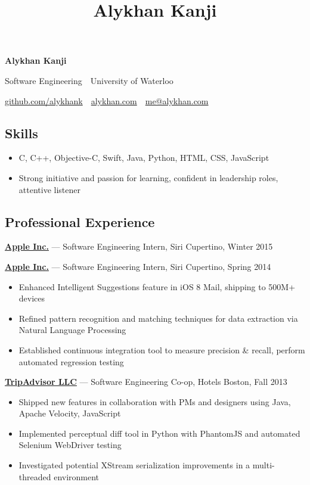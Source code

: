 \documentclass[11pt,letterpaper]{article}
\title{Alykhan Kanji}
\begin{document}
\begin{center}
  {\Huge \textbf{Alykhan Kanji}}

  {\large
    Software Engineering\ \textperiodcentered \ University of Waterloo

    \href{https://github.com/alykhank}{github.com/alykhank}\ \textperiodcentered \ \href{http://alykhan.com}{alykhan.com}\ \textperiodcentered \ \href{mailto:me@alykhan.com}{me@alykhan.com}
  }
\end{center}

\subsection*{Skills}

\begin{itemize}[before=,after=]
  \item C, C++, Objective-C, Swift, Java, Python, HTML, CSS, JavaScript
  \item Strong initiative and passion for learning, confident in leadership roles, attentive listener
\end{itemize}

\subsection*{Professional Experience}

\href{http://apple.com}{\textbf{Apple Inc.}} --- Software Engineering Intern, Siri \hfill {\color{gray} Cupertino, Winter 2015}
\vspace{6mm}

\href{http://apple.com}{\textbf{Apple Inc.}} --- Software Engineering Intern, Siri \hfill {\color{gray} Cupertino, Spring 2014}
\begin{itemize}
  \item Enhanced Intelligent Suggestions feature in iOS 8 Mail, shipping to 500M+ devices
  \item Refined pattern recognition and matching techniques for data extraction via Natural Language Processing
  \item Established continuous integration tool to measure precision \& recall, perform automated regression testing
\end{itemize}

\href{http://tripadvisor.com}{\textbf{TripAdvisor LLC}} --- Software Engineering Co-op, Hotels \hfill {\color{gray} Boston, Fall 2013}
\begin{itemize}
  \item Shipped new features in collaboration with PMs and designers using Java, Apache Velocity, JavaScript
  \item Implemented perceptual diff tool in Python with PhantomJS and automated Selenium WebDriver testing
  \item Investigated potential XStream serialization improvements in a multi-threaded environment
\end{itemize}
\end{document}
